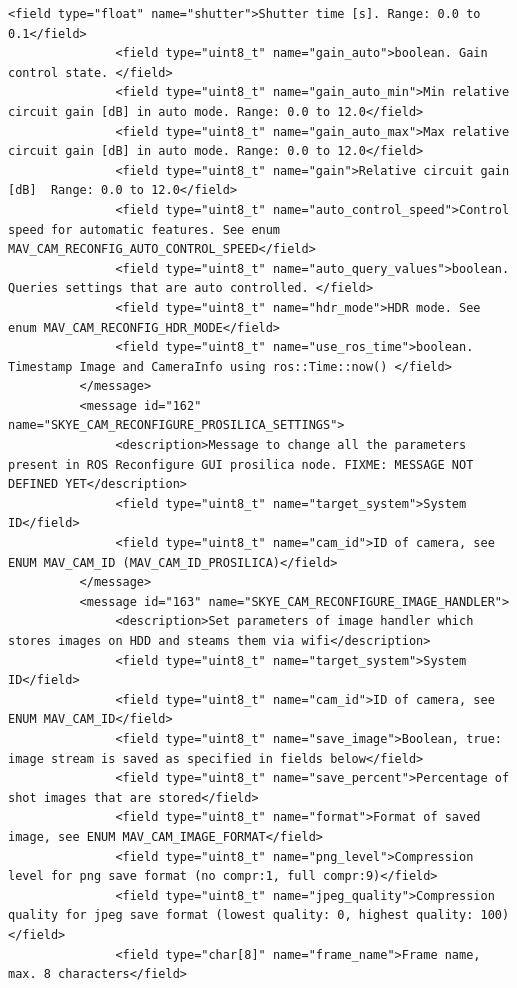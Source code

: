 \begin{lstlisting}[captionpos=b, caption="Definition of \textsc{Skye} specific Mavlink messages", label=app_xml]
               <field type="float" name="shutter">Shutter time [s]. Range: 0.0 to 0.1</field>
               <field type="uint8_t" name="gain_auto">boolean. Gain control state. </field>
               <field type="uint8_t" name="gain_auto_min">Min relative circuit gain [dB] in auto mode. Range: 0.0 to 12.0</field>
               <field type="uint8_t" name="gain_auto_max">Max relative circuit gain [dB] in auto mode. Range: 0.0 to 12.0</field>
               <field type="uint8_t" name="gain">Relative circuit gain [dB]  Range: 0.0 to 12.0</field>
               <field type="uint8_t" name="auto_control_speed">Control speed for automatic features. See enum MAV_CAM_RECONFIG_AUTO_CONTROL_SPEED</field>
               <field type="uint8_t" name="auto_query_values">boolean. Queries settings that are auto controlled. </field>
               <field type="uint8_t" name="hdr_mode">HDR mode. See enum MAV_CAM_RECONFIG_HDR_MODE</field>
               <field type="uint8_t" name="use_ros_time">boolean. Timestamp Image and CameraInfo using ros::Time::now() </field>
          </message>
          <message id="162" name="SKYE_CAM_RECONFIGURE_PROSILICA_SETTINGS">
               <description>Message to change all the parameters present in ROS Reconfigure GUI prosilica node. FIXME: MESSAGE NOT DEFINED YET</description>
               <field type="uint8_t" name="target_system">System ID</field>
               <field type="uint8_t" name="cam_id">ID of camera, see ENUM MAV_CAM_ID (MAV_CAM_ID_PROSILICA)</field>
          </message>
          <message id="163" name="SKYE_CAM_RECONFIGURE_IMAGE_HANDLER">
               <description>Set parameters of image handler which stores images on HDD and steams them via wifi</description>
               <field type="uint8_t" name="target_system">System ID</field>
               <field type="uint8_t" name="cam_id">ID of camera, see ENUM MAV_CAM_ID</field>
               <field type="uint8_t" name="save_image">Boolean, true: image stream is saved as specified in fields below</field>
               <field type="uint8_t" name="save_percent">Percentage of shot images that are stored</field>
               <field type="uint8_t" name="format">Format of saved image, see ENUM MAV_CAM_IMAGE_FORMAT</field>
               <field type="uint8_t" name="png_level">Compression level for png save format (no compr:1, full compr:9)</field>
               <field type="uint8_t" name="jpeg_quality">Compression quality for jpeg save format (lowest quality: 0, highest quality: 100)</field>
               <field type="char[8]" name="frame_name">Frame name, max. 8 characters</field>

\end{lstlisting}
